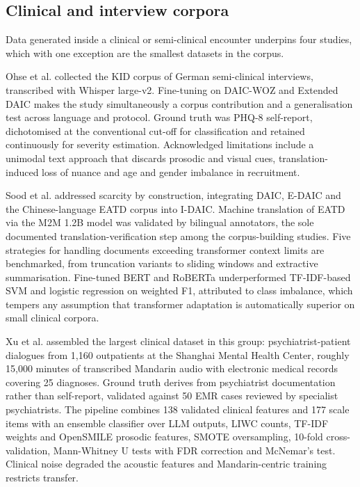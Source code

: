 \documentclass[11pt]{article}
\begin{document}
	\subsection{Clinical and interview corpora}
	
	Data generated inside a clinical or semi-clinical encounter underpins four studies, which with one exception are the smallest datasets in the corpus.
	
	Ohse et al.\cite{OHSE2024101663} collected the KID corpus of German semi-clinical interviews, transcribed with Whisper large-v2. Fine-tuning on DAIC-WOZ and Extended DAIC makes the study simultaneously a corpus contribution and a generalisation test across language and protocol. Ground truth was PHQ-8 self-report, dichotomised at the conventional cut-off for classification and retained continuously for severity estimation. Acknowledged limitations include a unimodal text approach that discards prosodic and visual cues, translation-induced loss of nuance and age and gender imbalance in recruitment.
	
	Sood et al.\cite{10385480} addressed scarcity by construction, integrating DAIC, E-DAIC and the Chinese-language EATD corpus into I-DAIC. Machine translation of EATD via the M2M 1.2B model was validated by bilingual annotators, the sole documented translation-verification step among the corpus-building studies. Five strategies for handling documents exceeding transformer context limits are benchmarked, from truncation variants to sliding windows and extractive summarisation. Fine-tuned BERT and RoBERTa underperformed TF-IDF-based SVM and logistic regression on weighted F1, attributed to class imbalance, which tempers any assumption that transformer adaptation is automatically superior on small clinical corpora.
	
	Xu et al.\cite{Xu2025.01.03.24318117} assembled the largest clinical dataset in this group: psychiatrist-patient dialogues from 1,160 outpatients at the Shanghai Mental Health Center, roughly 15,000 minutes of transcribed Mandarin audio with electronic medical records covering 25 diagnoses. Ground truth derives from psychiatrist documentation rather than self-report, validated against 50 EMR cases reviewed by specialist psychiatrists. The pipeline combines 138 validated clinical features and 177 scale items with an ensemble classifier over LLM outputs, LIWC counts, TF-IDF weights and OpenSMILE prosodic features, SMOTE oversampling, 10-fold cross-validation, Mann-Whitney U tests with FDR correction and McNemar's test. Clinical noise degraded the acoustic features and Mandarin-centric training restricts transfer.
	
\end{document}
